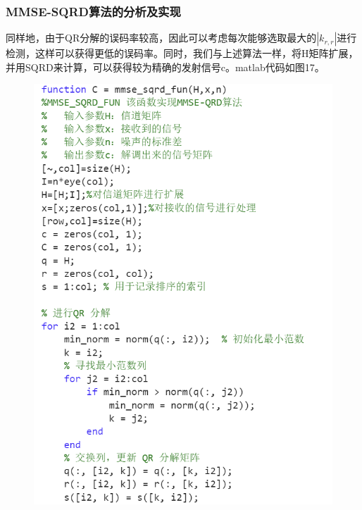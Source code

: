 \documentclass[a4paper,12pt]{article}
\begin{document}
	\subsubsection{MMSE-SQRD算法的分析及实现}
	同样地，由于QR分解的误码率较高，因此可以考虑每次能够选取最大的$|k_{r,r}|$进行检测，这样可以获得更低的误码率。同时，我们与上述算法一样，将H矩阵扩展，并用SQRD来计算，可以获得较为精确的发射信号c。matlab代码如图17。
	\begin{figure}[h]
		\centering
		\begin{minipage}{0.4\textwidth}
			\centering
			\includegraphics[width=\textwidth]{17.png}
		\end{minipage}
		\qquad
		\begin{minipage}{0.4\textwidth}
			\centering

\end{minipage}
\end{figure}
\end{document}
